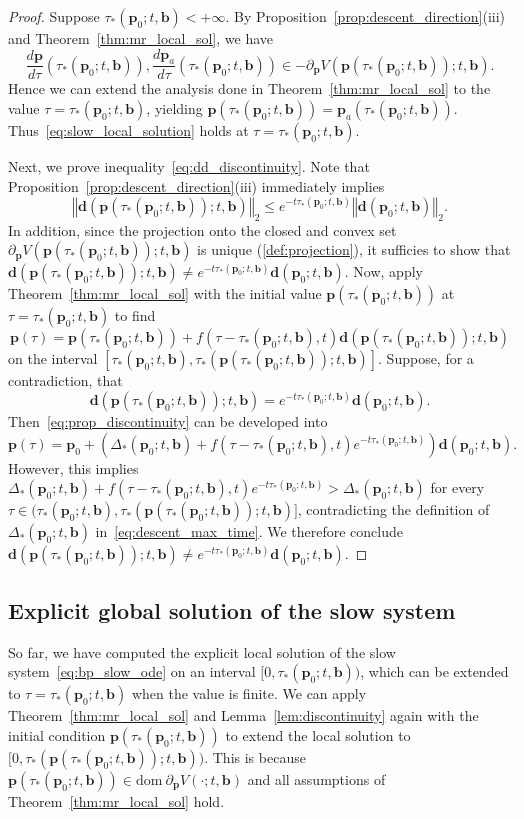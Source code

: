 \documentclass[11pt]{article}
\numberwithin{prop}{section}
\numberwithin{lem}{section}
\numberwithin{rem}{section}
\numberwithin{cor}{section}
\numberwithin{thm}{section}
\numberwithin{defn}{section}
\numberwithin{fact}{section}
\theoremstyle{plain}
\def\bb {\boldsymbol{b}}
\def\bd {\boldsymbol{d}}
\def\bp {\boldsymbol{p}}
\newcommand{\normtwo}[1]{\left\Vert{#1} \right\Vert_{2}}
\def\dom {\mathrm{dom~}}    %
\def\bpo {\bp_{0}}
\def\bpa {\bp_{a}}
\begin{document}
\begin{proof}
Suppose $\tau_{*}(\bpo;t,\bb) < +\infty$. By Proposition~\ref{prop:descent_direction}(iii) and Theorem~\ref{thm:mr_local_sol}, we have
\[
\frac{d\bp}{d\tau}(\tau_{*}(\bpo;t,\bb)), \frac{d\bpa}{d\tau}(\tau_{*}(\bpo;t,\bb)) \in -\partial_{\bp} V(\bp(\tau_{*}(\bpo;t,\bb));t,\bb).
\]
Hence we can extend the analysis done in Theorem~\ref{thm:mr_local_sol} to the value $\tau = \tau_{*}(\bpo;t,\bb)$, yielding $\bp(\tau_{*}(\bpo;t,\bb)) = \bpa(\tau_{*}(\bpo;t,\bb))$. Thus~\eqref{eq:slow_local_solution} holds at $\tau = \tau_{*}(\bpo;t,\bb)$. 


Next, we prove inequality~\eqref{eq:dd_discontinuity}. Note that Proposition~\ref{prop:descent_direction}(iii) immediately implies
\[
\normtwo{\bd(\bp(\tau_{*}(\bpo;t,\bb));t,\bb)} \leqslant e^{-t\tau_{*}(\bpo;t,\bb)}\normtwo{\bd(\bpo;t,\bb)}.
\]
In addition, since the projection onto the closed and convex set $\partial_{\bp} V(\bp(\tau_{*}(\bpo;t,\bb));t,\bb)$ is unique (\ref{def:projection}), it sufficies to show that $\bd(\bp(\tau_{*}(\bpo;t,\bb));t,\bb) \neq e^{-t\tau_{*}(\bpo;t,\bb)}\bd(\bpo;t,\bb)$. Now, apply Theorem~\ref{thm:mr_local_sol} with the initial value $\bp(\tau_{*}(\bpo;t,\bb))$ at $\tau = \tau_{*}(\bpo;t,\bb)$ to find
\begin{equation}\label{eq:prop_discontinuity}
\bp(\tau) = \bp(\tau_{*}(\bpo;t,\bb)) + f(\tau-\tau_{*}(\bpo;t,\bb),t)\bd(\bp(\tau_{*}(\bpo;t,\bb));t,\bb)
\end{equation}
on the interval $[\tau_{*}(\bpo;t,\bb),\tau_{*}(\bp(\tau_{*}(\bpo;t,\bb));t,\bb)]$. Suppose, for a contradiction, that
\[
\bd(\bp(\tau_{*}(\bpo;t,\bb));t,\bb) = e^{-t\tau_{*}(\bpo;t,\bb)}\bd(\bpo;t,\bb).
\] 
Then~\eqref{eq:prop_discontinuity} can be developed into
\[
\bp(\tau) = \bp_{0} + \left(\Delta_{*}(\bpo;t,\bb) + f(\tau-\tau_{*}(\bpo;t,\bb),t)e^{-t\tau_{*}(\bpo;t,\bb)}\right)\bd(\bpo;t,\bb).
\]
However, this implies $\Delta_{*}(\bpo;t,\bb) + f(\tau-\tau_{*}(\bpo;t,\bb),t)e^{-t\tau_{*}(\bpo;t,\bb)} > \Delta_{*}(\bpo;t,\bb)$ for every $\tau \in (\tau_{*}(\bpo;t,\bb),\tau_{*}(\bp(\tau_{*}(\bpo;t,\bb));t,\bb)]$, contradicting the definition of $\Delta_{*}(\bpo;t,\bb)$ in~\eqref{eq:descent_max_time}. We therefore conclude $\bd(\bp(\tau_{*}(\bpo;t,\bb));t,\bb) \neq e^{-t\tau_{*}(\bpo;t,\bb)}\bd(\bpo;t,\bb)$.
\end{proof}


\subsection{Explicit global solution of the slow system}\label{subsec:global}
So far, we have computed the explicit local solution of the slow system~\eqref{eq:bp_slow_ode} on an interval $[0,\tau_{*}(\bpo;t,\bb))$, which can be extended to $\tau = \tau_{*}(\bpo;t,\bb)$ when the value is finite. We can apply Theorem~\ref{thm:mr_local_sol} and Lemma~\ref{lem:discontinuity} again with the initial condition $\bp(\tau_{*}(\bpo;t,\bb))$ to extend the local solution to $[0, \tau_{*}(\bp(\tau_{*}(\bpo;t,\bb));t,\bb))$. This is because $\bp(\tau_{*}(\bpo;t,\bb)) \in \dom \partial_{\bp}V(\cdot;t,\bb)$ and all assumptions of Theorem~\ref{thm:mr_local_sol} hold.
\end{document}
